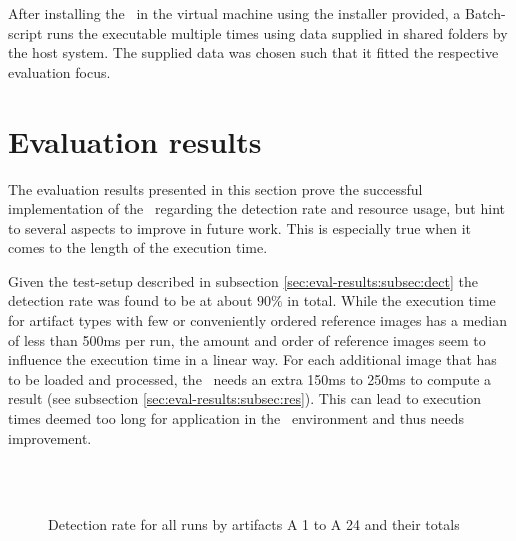 After installing the \vd~in the virtual machine using the installer provided, a Batch-script runs the executable multiple times using data supplied in shared folders by the host system. The supplied data was chosen such that it fitted the respective evaluation focus.

\section{Evaluation results}\label{sec:eval-results}

The evaluation results presented in this section prove the successful implementation of the \vd~regarding the detection rate and resource usage, but hint to several aspects to improve in future work. This is especially true when it comes to the length of the execution time.

Given the test-setup described in subsection \ref{sec:eval-results:subsec:dect} the detection rate was found to be at about $90\%$ in total. While the execution time for artifact types with few or conveniently ordered reference images has a median of less than 500ms per run, the amount and order of reference images seem to influence the execution time in a linear way. For each additional image that has to be loaded and processed, the \vd~needs an extra 150ms to 250ms to compute a result (see subsection \ref{sec:eval-results:subsec:res}). This can lead to execution times deemed too long for application in the \ape~environment and thus needs improvement.

\begin{figure}[h!]
	\hfill\\
	\hfill\\
	\caption{Detection rate for all runs by artifacts A 1 to A 24 and their totals}\label{fig:result-quality-sum}
\end{figure}

